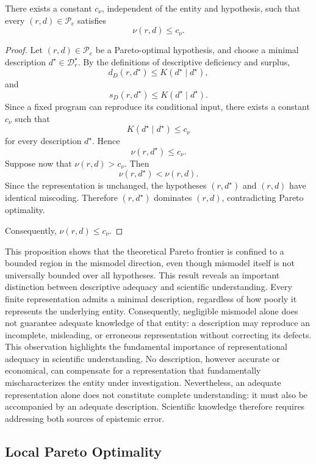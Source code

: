 \begin{proposition}
\label{prop:pareto_mismodel_bound}
There exists a constant $c_\nu$, independent of the entity and hypothesis, such that every $(r,d)\in\mathcal P_e$ satisfies
\[
\nu(r,d)\leq c_\nu.
\]
\end{proposition}
\begin{proof}
Let $(r,d)\in\mathcal P_e$ be a Pareto-optimal hypothesis, and choose a minimal description $d^\star\in\mathcal D_r^\star$. By the definitions of descriptive deficiency and surplus,
\[
d_D(r,d^\star)\leq K(d^\star\mid d^\star),
\]
and
\[
s_D(r,d^\star)\leq K(d^\star\mid d^\star).
\]
Since a fixed program can reproduce its conditional input, there exists a constant $c_\nu$ such that
\[
K(d^\star\mid d^\star)\leq c_\nu
\]
for every description $d^\star$. Hence
\[
\nu(r,d^\star)\leq c_\nu.
\]
Suppose now that $\nu(r,d)>c_\nu$. Then
\[
\nu(r,d^\star)<\nu(r,d).
\]
Since the representation is unchanged, the hypotheses $(r,d^\star)$ and $(r,d)$ have identical miscoding.
Therefore $(r,d^\star)$ dominates $(r,d)$, contradicting Pareto optimality.

Consequently, $\nu(r,d)\leq c_\nu$.
\end{proof}

This proposition shows that the theoretical Pareto frontier is confined to a bounded region in the mismodel direction, even though mismodel itself is not universally bounded over all hypotheses. This result reveals an important distinction between descriptive adequacy and scientific understanding. Every finite representation admits a minimal description, regardless of how poorly it represents the underlying entity. Consequently, negligible mismodel alone does not guarantee adequate knowledge of that entity: a description may reproduce an incomplete, misleading, or erroneous representation without correcting its defects. This observation highlights the fundamental importance of representational adequacy in scientific understanding. No description, however accurate or economical, can compensate for a representation that fundamentally mischaracterizes the entity under investigation. Nevertheless, an adequate representation alone does not constitute complete understanding: it must also be accompanied by an adequate description. Scientific knowledge therefore requires addressing both
sources of epistemic error.


\subsection*{Local Pareto Optimality}
\label{sec:local_pareto_optimality}

